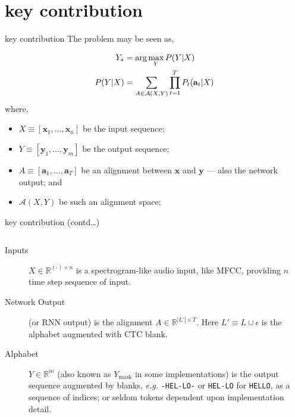 \documentclass[aspectratio=169,xcolor={dvipsnames,svgnames}]{beamer}
\begin{document}
\section{key contribution}
\label{sec:org48f7ce8}
\begin{frame}[label={sec:orgaea53af}]{key contribution}
The problem may be seen as,

\begin{align}
  \notag
  Y_*
  &= \arg\max_YP(Y|X) \\
  \notag
  P(Y|X)
  &= \sum_{A \in \mathcal{A} (X,Y)} \prod_{t=1}^T
    P_t(\mathbf{a}_t|X) 
\end{align}
where,
\begin{itemize}
\item \(X\equiv[\mathbf{x}_1,\ldots,\mathbf{x}_n]\) be the
input sequence;
\item \(Y\equiv[\mathbf{y}_1,\ldots,\mathbf{y}_m]\) be the
output sequence;
\item \(A\equiv[\mathbf{a}_1,\ldots,\mathbf{a}_T]\) be an
alignment between \(\mathbf{x}\) and \(\mathbf{y}\) ---
also the network output; and
\item \(\mathcal{A} (X,Y)\) be such an alignment space;
\end{itemize}
\end{frame}

\begin{frame}[label={sec:orgcc80858},fragile]{key contribution (contd\ldots)}
 \begin{columns}
\begin{column}{.7\columnwidth}
\begin{description}
\item[{Inputs}] \(X\in\mathbb{R}^{(\cdot)\times n}\) is a
spectrogram-like audio input, like MFCC, providing
\(n\) time step sequence of input.
\item[{Network Output}] (or RNN output) is the alignment
\(A\in\mathbb{R}^{|L'|\times T}\). Here \(L'\equiv
  L\cup{\epsilon}\) is the alphabet augmented with CTC
blank.
\item[{Alphabet}] \(Y\in\mathbb{R}^{m}\) (also known as
\(Y_{\text{mask}}\) in some implementations) is the
output sequence augmented by blanks, \emph{e.g.}
\texttt{-HEL-LO-} or \texttt{HEL-LO} for \texttt{HELLO}, as a sequence of
indices; or seldom tokens dependent upon
implementation detail.
\end{description}
\end{column}
\end{columns}
\end{frame}
\end{document}
